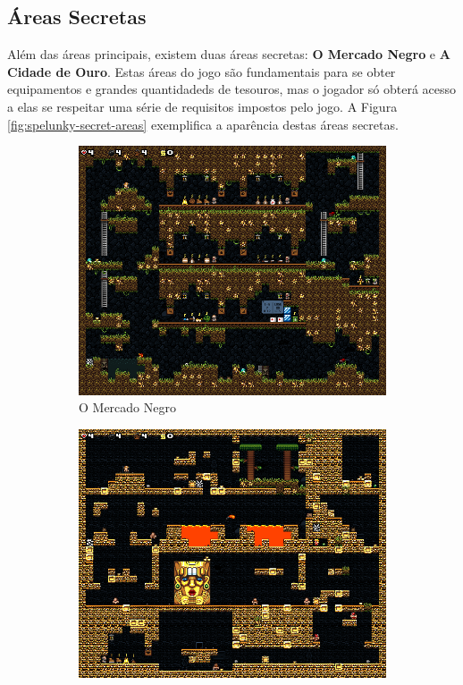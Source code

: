 \subsection{Áreas Secretas}
Além das áreas principais, existem duas áreas secretas: \textbf{O Mercado Negro}
e \textbf{A Cidade de Ouro}. Estas áreas do jogo são fundamentais para se obter
equipamentos e grandes quantidadeds de tesouros, mas o jogador só obterá acesso
a elas se respeitar uma série de requisitos impostos pelo jogo. A Figura
\ref{fig:spelunky-secret-areas} exemplifica a aparência destas áreas secretas.

\begin{figure}[htb!]
\centering
	\begin{subfigure}[b]{0.4\textwidth}
		\includegraphics[width=\textwidth]{fig/spelunky-blackmarket.png}
		\caption{O Mercado Negro}
		\label{fig:spelunky-blackmarket}
	\end{subfigure}
	\begin{subfigure}[b]{0.4\textwidth}
		\includegraphics[width=\textwidth]{fig/spelunky-cityofgold.png}

\end{subfigure}
\end{figure}
